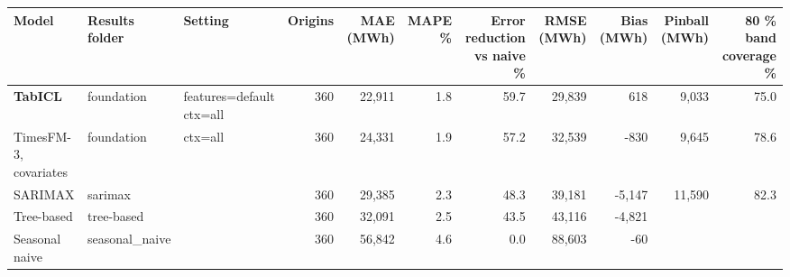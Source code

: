 \begin{tabular}{lllrrrrrrrr}
\toprule
Model & Results folder & Setting & Origins & MAE (MWh) & MAPE \% & Error reduction vs naive \% & RMSE (MWh) & Bias (MWh) & Pinball (MWh) & 80 \% band coverage \% \\
\midrule
\textbf{TabICL} & foundation & features=default ctx=all & 360 & 22,911 & 1.8 & 59.7 & 29,839 & 618 & 9,033 & 75.0 \\
TimesFM-3, covariates & foundation & ctx=all & 360 & 24,331 & 1.9 & 57.2 & 32,539 & -830 & 9,645 & 78.6 \\
SARIMAX & sarimax &  & 360 & 29,385 & 2.3 & 48.3 & 39,181 & -5,147 & 11,590 & 82.3 \\
Tree-based & tree-based &  & 360 & 32,091 & 2.5 & 43.5 & 43,116 & -4,821 &  &  \\
Seasonal naive & seasonal\_naive &  & 360 & 56,842 & 4.6 & 0.0 & 88,603 & -60 &  &  \\
\bottomrule
\end{tabular}
